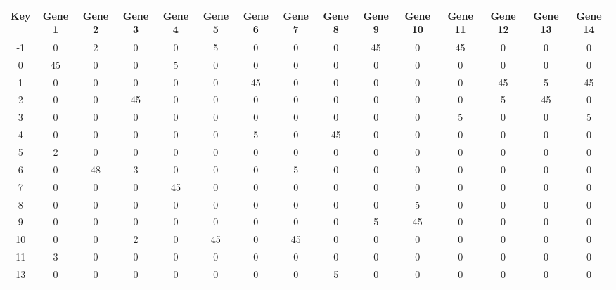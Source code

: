 \begin{tabular}{|c|c|c|c|c|c|c|c|c|c|c|c|c|c|c|}
\hline
Key & Gene 1 & Gene 2 & Gene 3 & Gene 4 & Gene 5 & Gene 6 & Gene 7 & Gene 8 & Gene 9 & Gene 10 & Gene 11 & Gene 12 & Gene 13 & Gene 14 \\
\hline
-1 & 0 & 2 & 0 & 0 & 5 & 0 & 0 & 0 & 45 & 0 & 45 & 0 & 0 & 0 \\
0 & 45 & 0 & 0 & 5 & 0 & 0 & 0 & 0 & 0 & 0 & 0 & 0 & 0 & 0 \\
1 & 0 & 0 & 0 & 0 & 0 & 45 & 0 & 0 & 0 & 0 & 0 & 45 & 5 & 45 \\
2 & 0 & 0 & 45 & 0 & 0 & 0 & 0 & 0 & 0 & 0 & 0 & 5 & 45 & 0 \\
3 & 0 & 0 & 0 & 0 & 0 & 0 & 0 & 0 & 0 & 0 & 5 & 0 & 0 & 5 \\
4 & 0 & 0 & 0 & 0 & 0 & 5 & 0 & 45 & 0 & 0 & 0 & 0 & 0 & 0 \\
5 & 2 & 0 & 0 & 0 & 0 & 0 & 0 & 0 & 0 & 0 & 0 & 0 & 0 & 0 \\
6 & 0 & 48 & 3 & 0 & 0 & 0 & 5 & 0 & 0 & 0 & 0 & 0 & 0 & 0 \\
7 & 0 & 0 & 0 & 45 & 0 & 0 & 0 & 0 & 0 & 0 & 0 & 0 & 0 & 0 \\
8 & 0 & 0 & 0 & 0 & 0 & 0 & 0 & 0 & 0 & 5 & 0 & 0 & 0 & 0 \\
9 & 0 & 0 & 0 & 0 & 0 & 0 & 0 & 0 & 5 & 45 & 0 & 0 & 0 & 0 \\
10 & 0 & 0 & 2 & 0 & 45 & 0 & 45 & 0 & 0 & 0 & 0 & 0 & 0 & 0 \\
11 & 3 & 0 & 0 & 0 & 0 & 0 & 0 & 0 & 0 & 0 & 0 & 0 & 0 & 0 \\
13 & 0 & 0 & 0 & 0 & 0 & 0 & 0 & 5 & 0 & 0 & 0 & 0 & 0 & 0 \\
\hline
\end{tabular}